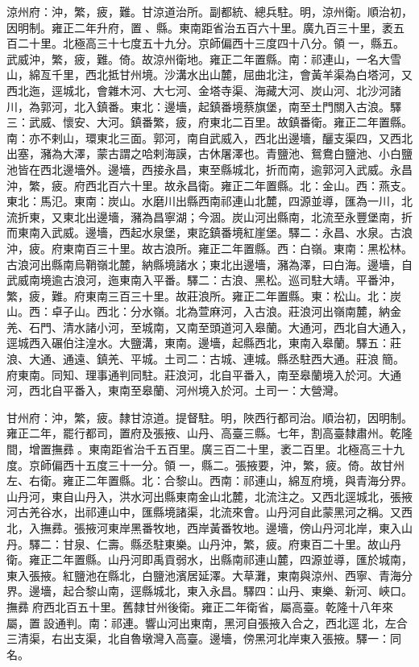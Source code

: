 \begin{pinyinscope}
涼州府：沖，繁，疲，難。甘涼道治所。副都統、總兵駐。明，涼州衛。順治初，因明制。雍正二年升府，置、縣。東南距省治五百六十里。廣九百三十里，袤五百二十里。北極高三十七度五十九分。京師偏西十三度四十八分。領一，縣五。武威沖，繁，疲，難。倚。故涼州衛地。雍正二年置縣。南：祁連山，一名大雪山，綿亙千里，西北抵甘州境。沙溝水出山麓，屈曲北注，會黃羊渠為白塔河，又西北迤，逕城北，會雜木河、大七河、金塔寺渠、海藏大河、炭山河、北沙河諸川，為郭河，北入鎮番。東北：邊墻，起鎮番境蔡旗堡，南至土門關入古浪。驛三：武威、懷安、大河。鎮番繁，疲，府東北二百里。故鎮番衛。雍正二年置縣。南：亦不剌山，環東北三面。郭河，南自武威入，西北出邊墻，釃支渠四，又西北出塞，瀦為大澤，蒙古謂之哈剌海謨，古休屠澤也。青鹽池、鴛鴦白鹽池、小白鹽池皆在西北邊墻外。邊墻，西接永昌，東至縣城北，折而南，逾郭河入武威。永昌沖，繁，疲。府西北百六十里。故永昌衛。雍正二年置縣。北：金山。西：燕支。東北：馬氾。東南：炭山。水磨川出縣西南祁連山北麓，四源並導，匯為一川，北流折東，又東北出邊墻，瀦為昌寧湖；今涸。炭山河出縣南，北流至永豐堡南，折而東南入武威。邊墻，西起水泉堡，東訖鎮番境紅崖堡。驛二：永昌、水泉。古浪沖，疲。府東南百三十里。故古浪所。雍正二年置縣。西：白嶺。東南：黑松林。古浪河出縣南烏鞘嶺北麓，納縣境諸水；東北出邊墻，瀦為澤，曰白海。邊墻，自武威南境逾古浪河，迤東南入平番。驛二：古浪、黑松。巡司駐大靖。平番沖，繁，疲，難。府東南三百三十里。故莊浪所。雍正二年置縣。東：松山。北：炭山。西：卓子山。西北：分水嶺。北為萱麻河，入古浪。莊浪河出嶺南麓，納金羌、石門、清水諸小河，至城南，又南至頭道河入皋蘭。大通河，西北自大通入，逕城西入碾伯注湟水。大鹽溝，東南。邊墻，起縣西北，東南入皋蘭。驛五：莊浪、大通、通遠、鎮羌、平城。土司二：古城、連城。縣丞駐西大通。莊浪簡。府東南。同知、理事通判同駐。莊浪河，北自平番入，南至皋蘭境入於河。大通河，西北自平番入，東南至皋蘭、河州境入於河。土司一：大營灣。

甘州府：沖，繁，疲。隸甘涼道。提督駐。明，陜西行都司治。順治初，因明制。雍正二年，罷行都司，置府及張掖、山丹、高臺三縣。七年，割高臺隸肅州。乾隆間，增置撫彞。東南距省治千五百里。廣三百二十里，袤二百里。北極高三十九度。京師偏西十五度三十一分。領一，縣二。張掖要，沖，繁，疲。倚。故甘州左、右衛。雍正二年置縣。北：合黎山。西南：祁連山，綿亙府境，與青海分界。山丹河，東自山丹入，洪水河出縣東南金山北麓，北流注之。又西北逕城北，張掖河古羌谷水，出祁連山中，匯縣境諸渠，北流來會。山丹河自此蒙黑河之稱。又西北，入撫彞。張掖河東岸黑番牧地，西岸黃番牧地。邊墻，傍山丹河北岸，東入山丹。驛二：甘泉、仁壽。縣丞駐東樂。山丹沖，繁，疲。府東百二十里。故山丹衛。雍正二年置縣。山丹河即禹貢弱水，出縣南祁連山麓，四源並導，匯於城南，東入張掖。紅鹽池在縣北，白鹽池濱居延澤。大草灘，東南與涼州、西寧、青海分界。邊墻，起合黎山南，逕縣城北，東入永昌。驛四：山丹、東樂、新河、峽口。撫彞府西北百五十里。舊隸甘州後衛。雍正二年衛省，屬高臺。乾隆十八年來屬，置設通判。南：祁連。響山河出東南，黑河自張掖入合之，西北逕北，左合三清渠，右出支渠，北自魯墩灣入高臺。邊墻，傍黑河北岸東入張掖。驛一：同名。


\end{pinyinscope}
